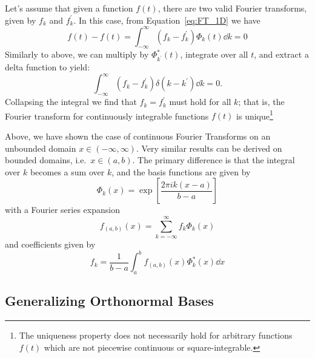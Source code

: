 Let's assume that given a function $f(t)$, there are two valid Fourier
transforms, given by $f_k$ and $f^\prime_k$.  In this case, from
Equation~\ref{eq:FT_1D} we have
\begin{equation}
  f(t) - f(t) = \int_{-\infty}^\infty (f_k - f^\prime_k) \Phi_k(t) \dd k = 0
\end{equation}
Similarly to above, we can multiply by $\Phi^\ast_{k^\prime}(t)$,
integrate over all $t$, and extract a delta function to yield:
\begin{equation}
  \int_{-\infty}^\infty (f_k - f^\prime_k) \delta(k - k^\prime) \dd k = 0.
\end{equation}
Collapsing the integral we find that $f_k = f^\prime_k$ must hold for all $k$;
that is, the Fourier transform for continuously integrable functions
$f(t)$ is unique\footnote{The uniqueness property does not necessarily
hold for arbitrary functions $f(t)$ which are not piecewise continuous
or square-integrable.}

Above, we have shown the case of continuous Fourier Transforms on an
unbounded domain $x \in (-\infty, \infty)$.  Very similar results can
be derived on bounded domains, i.e.~$x \in (a, b)$.  The primary difference
is that the integral over $k$ becomes a sum over $k$, and the basis functions
are given by
\begin{equation}
  \Phi_k(x) = \exp\left[\frac{2\pi i k (x - a)}{b - a}\right]
\end{equation}
with a Fourier series expansion
\begin{equation}
  \label{eq:FS_1D}
  f_{(a, b)}(x) = \sum_{k=-\infty}^\infty f_k \Phi_k(x)
\end{equation}
and coefficients given by
\begin{equation}
  \label{eq:IFS_1D}
  f_k = \frac{1}{b - a}\int_a^b f_{(a, b)}(x) \Phi^\ast_k(x) \dd x
\end{equation}

\subsection{Generalizing Orthonormal Bases}

